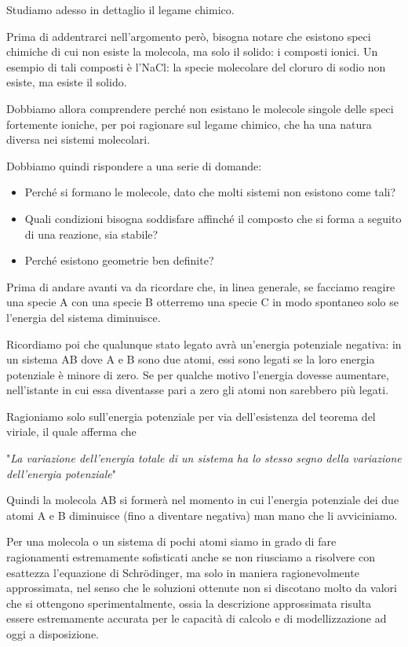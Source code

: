 Studiamo adesso in dettaglio il legame chimico.

Prima di addentrarci nell'argomento però, bisogna notare che esistono speci chimiche di cui non esiste la molecola, ma solo il solido: i composti ionici. Un esempio di tali composti è l'NaCl: la specie molecolare del cloruro di sodio non esiste, ma esiste il solido.

Dobbiamo allora comprendere perché non esistano le molecole singole delle speci fortemente ioniche, per poi ragionare sul legame chimico, che ha una natura diversa nei sistemi molecolari.

Dobbiamo quindi rispondere a una serie di domande:
\begin{itemize}
    \item Perché si formano le molecole, dato che molti sistemi non esistono come tali?
    \item Quali condizioni bisogna soddisfare affinché il composto che si forma a seguito di una reazione, sia stabile?
    \item Perché esistono geometrie ben definite?
\end{itemize}
Prima di andare avanti va da ricordare che, in linea generale, se facciamo reagire una specie A con una specie B otterremo una specie C in modo spontaneo solo se l'energia del sistema diminuisce. 

Ricordiamo poi che qualunque stato legato avrà un'energia potenziale negativa: in un sistema AB dove A e B sono due atomi, essi sono legati se la loro energia potenziale è minore di zero. Se per qualche motivo l'energia dovesse aumentare, nell'istante in cui essa diventasse pari a zero gli atomi non sarebbero più legati.

Ragioniamo solo sull'energia potenziale per via dell'esistenza del teorema del viriale, il quale afferma che

\vspace{0.2cm}"\textit{La variazione dell'energia totale di un sistema ha lo stesso segno della variazione dell'energia potenziale}"

\vspace{0.2cm}Quindi la molecola AB si formerà nel momento in cui l'energia potenziale dei due atomi A e B diminuisce (fino a diventare negativa) man mano che li avviciniamo.

\vspace{0.2cm}Per una molecola o un sistema di pochi atomi siamo in grado di fare ragionamenti estremamente sofisticati anche se non riusciamo a risolvere con esattezza l'equazione di Schrödinger, ma solo in maniera ragionevolmente approssimata, nel senso che le soluzioni ottenute non si discotano molto da valori che si ottengono sperimentalmente, ossia la descrizione approssimata risulta essere estremamente accurata per le capacità di calcolo e di modellizzazione ad oggi a disposizione.

